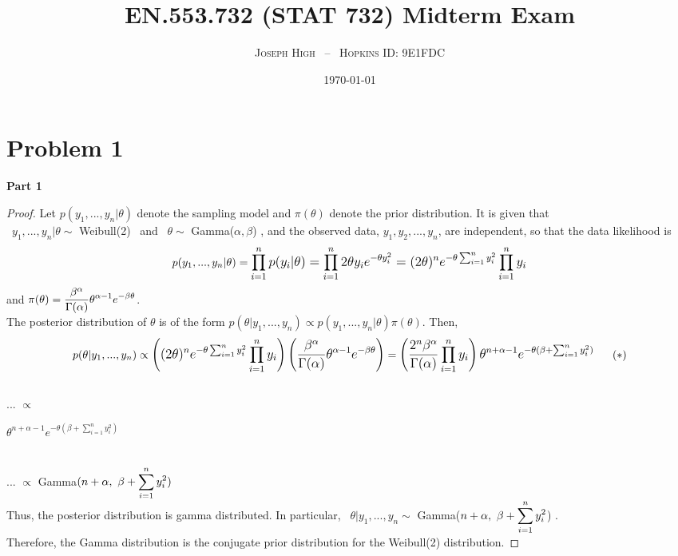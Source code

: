 \documentclass[10pt,a4paper]{article}
\begin{document}
\title{\textsc{EN.553.732 (STAT 732)} Midterm Exam}
\author{\textsc{Joseph High} \ -- \ \textsc{Hopkins ID: 9E1FDC}}
\date{\today}
\maketitle

\section{Problem 1}
\textbf{Part 1}
\begin{proof}
Let $p(y_1, ..., y_n\vert\theta)$ denote the sampling model and $\pi(\theta)$ denote the prior distribution. It is given that
\\\ 
$y_1, ..., y_n\vert\theta \sim$ Weibull(2) \ and \  $\theta \sim$ Gamma($\alpha, \beta$) , and the observed data, $y_1, y_2,...,y_n$, are independent, so that the data likelihood is \\ $$p(y_1, ..., y_n\vert\theta) = \mathlarger{\prod_{i=1}^{n}p(y_i\vert\theta) = \prod_{i=1}^{n}2\theta y_ie^{-\theta y_i^2} = (2\theta)^ne^{-\theta\sum_{i=1}^{n}y_i^2}\prod_{i=1}^{n}y_i}$$ and $\pi(\theta) = \mathlarger{\frac{\beta^{\alpha}}{\Gamma(\alpha)}\theta^{\alpha-1}e^{-\beta\theta}}$.\\
The posterior distribution of $\theta$ is of the form   $p(\theta\vert y_1, ..., y_n) \propto p(y_1,...,y_n\vert\theta)\pi(\theta)$. Then, $$p(\theta\vert y_1, ..., y_n) \propto \mathlarger{\left((2\theta)^ne^{-\theta\sum_{i=1}^{n}y_i^2}\prod_{i=1}^{n}y_i\right)\left(\frac{\beta^{\alpha}}{\Gamma(\alpha)}\theta^{\alpha-1}e^{-\beta\theta}\right)} = \mathlarger{\left(\frac{2^n\beta^{\alpha}}{\Gamma(\alpha)}\prod_{i=1}^{n}y_i\right)\theta^{n+\alpha-1}e^{-\theta(\beta + \sum_{i=1}^{n}y_i^2)}} \ \ \ \ \ (\ast)$$\\  ...\hspace{9.7cm} $\propto$ \ \begin{large}$\theta^{n+\alpha-1}e^{-\theta(\beta + \sum_{i=1}^{n}y_i^2)}$\end{large}\\ ...\hspace{9.7cm} $\propto$ Gamma$(n + \alpha,\ \beta + \mathlarger{\sum_{i=1}^{n}y_i^2})$\\
Thus, the posterior distribution is gamma distributed. In particular, \ $\theta\vert y_1, ..., y_n \sim$ Gamma($n + \alpha,\ \beta + \mathlarger{\sum_{i=1}^{n}y_i^2}$) .\\
Therefore, the Gamma distribution is the conjugate prior distribution for the Weibull(2) distribution.
\end{proof}
\end{document}
